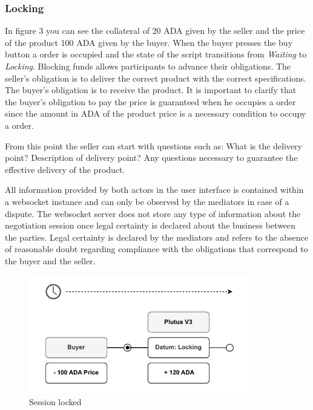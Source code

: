 \documentclass[12pt]{article}
\begin{document}
\subsubsection { Locking } 

In figure 3 you can see the collateral of 20 ADA given by the seller and the price of the product 100 ADA given by the buyer.
When the buyer presses the buy button a order is occupied and the state of the script transitions from \emph{Waiting} to \emph{Locking}.
Blocking funds allows participants to advance their obligations.
The seller's obligation is to deliver the correct product with the correct specifications. The buyer's obligation is to receive the product.
It is important to clarify that the buyer's obligation to pay the price is guaranteed when he occupies a order since the amount in ADA of the product price is a necessary condition to occupy a order.

From this point the seller can start with questions such as: What is the delivery point? Description of delivery point? Any questions necessary to guarantee the effective delivery of the product.

All information provided by both actors in the user interface is contained within a websocket instance and can only be observed by the mediators in case of a dispute.
The websocket server does not store any type of information about the negotiation session once legal certainty is declared about the business between the parties.
Legal certainty is declared by the mediators and refers to the absence of reasonable doubt regarding compliance with the obligations that correspond to the buyer and the seller.

\begin{figure}[ht]
  \centering
  \includegraphics[width=0.88\textwidth, keepaspectratio]{2.pdf}
  \caption{Session locked}
  \label{fig:locking}
\end{figure}
\end{document}
